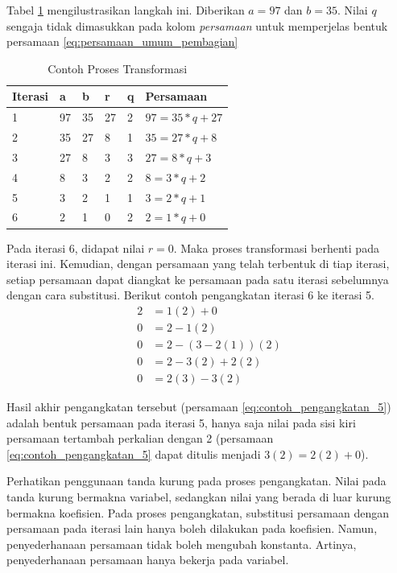 Tabel \ref{tab:transformasi_ext_euclid} mengilustrasikan langkah ini. Diberikan $ a = 97 $ dan $ b = 35 $. Nilai $ q $ sengaja tidak dimasukkan pada kolom \textit{persamaan} untuk memperjelas bentuk persamaan \eqref{eq:persamaan_umum_pembagian}
\begin{table}[h!]
\Centering
\caption{Contoh Proses Transformasi}
\label{tab:transformasi_ext_euclid}
\begin{tabular}{ |l|l|l|l|l|l| }
	\hline
	Iterasi	& a		& b		& r		& q		& Persamaan \\
	\hline
	1		& 97	& 35	& 27	& 2		& $ 97 = 35 * q + 27 $ \\
	2		& 35	& 27	& 8		& 1		& $ 35 = 27 * q + 8 $ \\
	3		& 27	& 8		& 3		& 3		& $ 27 = 8 * q + 3 $ \\
	4		& 8		& 3		& 2		& 2		& $ 8 = 3 * q + 2 $ \\
	5		& 3		& 2		& 1		& 1		& $ 3 = 2 * q + 1 $ \\
	6		& 2		& 1		& 0		& 2		& $ 2 = 1 * q + 0 $ \\
	\hline
\end{tabular}
\end{table}

Pada iterasi 6, didapat nilai $ r = 0 $. Maka proses transformasi berhenti pada iterasi ini. Kemudian, dengan persamaan yang telah terbentuk di tiap iterasi, setiap persamaan dapat diangkat ke persamaan pada satu iterasi sebelumnya dengan cara substitusi. Berikut contoh pengangkatan iterasi 6 ke iterasi 5.
\begin{align}
2 &=1(2)+0 \label{eq:contoh_pengangkatan_1} \\
0 &=2-1(2) \label{eq:contoh_pengangkatan_2} \\
0 &=2-(3-2(1))(2) \label{eq:contoh_pengangkatan_3} \\
0 &=2-3(2)+2(2) \label{eq:contoh_pengangkatan_4} \\
0 &=2(3)-3(2) \label{eq:contoh_pengangkatan_5}
\end{align}

Hasil akhir pengangkatan tersebut (persamaan \eqref{eq:contoh_pengangkatan_5}) adalah bentuk persamaan pada iterasi 5, hanya saja nilai pada sisi kiri persamaan tertambah perkalian dengan 2 (persamaan \eqref{eq:contoh_pengangkatan_5} dapat ditulis menjadi $ 3(2)=2(2)+0 $).

Perhatikan penggunaan tanda kurung pada proses pengangkatan. Nilai pada tanda kurung bermakna variabel, sedangkan nilai yang berada di luar kurung bermakna koefisien. Pada proses pengangkatan, substitusi persamaan dengan persamaan pada iterasi lain hanya boleh dilakukan pada koefisien. Namun, penyederhanaan persamaan tidak boleh mengubah konstanta. Artinya, penyederhanaan persamaan hanya bekerja pada variabel.

